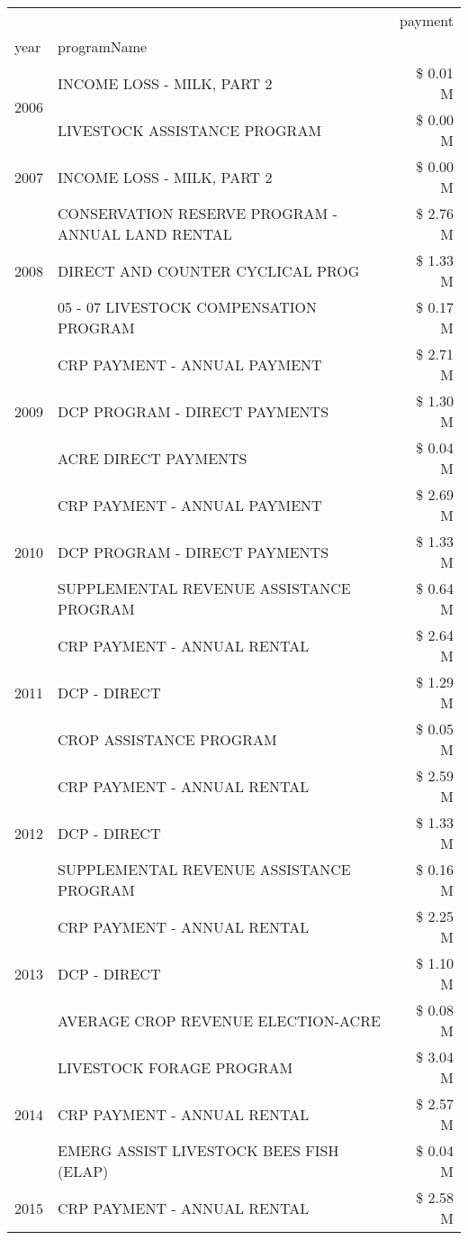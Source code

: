 \begin{tabular}{llr}
\toprule
 &  & payment \\
year & programName &  \\
\midrule
\multirow[t]{2}{*}{2006} & INCOME LOSS - MILK, PART 2 & \$ 0.01 M \\
 & LIVESTOCK ASSISTANCE PROGRAM & \$ 0.00 M \\
\cline{1-3}
2007 & INCOME LOSS - MILK, PART 2 & \$ 0.00 M \\
\cline{1-3}
\multirow[t]{3}{*}{2008} & CONSERVATION RESERVE PROGRAM - ANNUAL LAND RENTAL & \$ 2.76 M \\
 & DIRECT AND COUNTER CYCLICAL PROG & \$ 1.33 M \\
 & 05 - 07 LIVESTOCK COMPENSATION PROGRAM & \$ 0.17 M \\
\cline{1-3}
\multirow[t]{3}{*}{2009} & CRP PAYMENT - ANNUAL PAYMENT & \$ 2.71 M \\
 & DCP PROGRAM - DIRECT PAYMENTS & \$ 1.30 M \\
 & ACRE DIRECT PAYMENTS & \$ 0.04 M \\
\cline{1-3}
\multirow[t]{3}{*}{2010} & CRP PAYMENT - ANNUAL PAYMENT & \$ 2.69 M \\
 & DCP PROGRAM - DIRECT PAYMENTS & \$ 1.33 M \\
 & SUPPLEMENTAL REVENUE ASSISTANCE PROGRAM & \$ 0.64 M \\
\cline{1-3}
\multirow[t]{3}{*}{2011} & CRP PAYMENT - ANNUAL RENTAL & \$ 2.64 M \\
 & DCP - DIRECT & \$ 1.29 M \\
 & CROP ASSISTANCE PROGRAM & \$ 0.05 M \\
\cline{1-3}
\multirow[t]{3}{*}{2012} & CRP PAYMENT - ANNUAL RENTAL & \$ 2.59 M \\
 & DCP - DIRECT & \$ 1.33 M \\
 & SUPPLEMENTAL REVENUE ASSISTANCE PROGRAM & \$ 0.16 M \\
\cline{1-3}
\multirow[t]{3}{*}{2013} & CRP PAYMENT - ANNUAL RENTAL & \$ 2.25 M \\
 & DCP - DIRECT & \$ 1.10 M \\
 & AVERAGE CROP REVENUE ELECTION-ACRE & \$ 0.08 M \\
\cline{1-3}
\multirow[t]{3}{*}{2014} & LIVESTOCK FORAGE PROGRAM & \$ 3.04 M \\
 & CRP PAYMENT - ANNUAL RENTAL & \$ 2.57 M \\
 & EMERG ASSIST LIVESTOCK BEES FISH (ELAP) & \$ 0.04 M \\
\cline{1-3}
\multirow[t]{3}{*}{2015} & CRP PAYMENT - ANNUAL RENTAL & \$ 2.58 M \\

\end{tabular}
